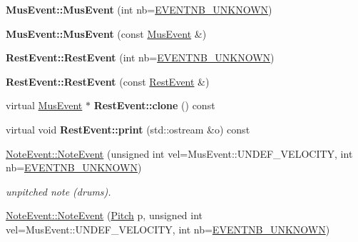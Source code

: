 \begin{DoxyCompactItemize}
\mbox{\label{group__segment_ga00b69e8f1bf80a478fce420d5d378c17}} 
{\bfseries Mus\+Event\+::\+Mus\+Event} (int nb=\mbox{\hyperlink{group__general_gac3b19762b16f33de03662fd4289fe5a9}{E\+V\+E\+N\+T\+N\+B\+\_\+\+U\+N\+K\+N\+O\+WN}})
\item 
\mbox{\label{group__segment_ga40f47305a4bd7afbf26a4fbee663dd27}} 
{\bfseries Mus\+Event\+::\+Mus\+Event} (const \mbox{\hyperlink{classMusEvent}{Mus\+Event}} \&)
\item 
\mbox{\label{group__segment_gaafcefa86601b97d137cfba40ed349414}} 
{\bfseries Rest\+Event\+::\+Rest\+Event} (int nb=\mbox{\hyperlink{group__general_gac3b19762b16f33de03662fd4289fe5a9}{E\+V\+E\+N\+T\+N\+B\+\_\+\+U\+N\+K\+N\+O\+WN}})
\item 
\mbox{\label{group__segment_gac4e65b67dedabe1736d414b8b4ab7e91}} 
{\bfseries Rest\+Event\+::\+Rest\+Event} (const \mbox{\hyperlink{classRestEvent}{Rest\+Event}} \&)
\item 
\mbox{\label{group__segment_ga6ebb6acd4c78929d31a4831c58911639}} 
virtual \mbox{\hyperlink{classMusEvent}{Mus\+Event}} $\ast$ {\bfseries Rest\+Event\+::clone} () const
\item 
\mbox{\label{group__segment_ga0b9fce9fff8648eae4a51a77957fab45}} 
virtual void {\bfseries Rest\+Event\+::print} (std\+::ostream \&o) const
\item 
\mbox{\label{group__segment_gaeeb3a0d391bef4a285f1be45d31e63be}} 
\mbox{\hyperlink{group__segment_gaeeb3a0d391bef4a285f1be45d31e63be}{Note\+Event\+::\+Note\+Event}} (unsigned int vel=Mus\+Event\+::\+U\+N\+D\+E\+F\+\_\+\+V\+E\+L\+O\+C\+I\+TY, int nb=\mbox{\hyperlink{group__general_gac3b19762b16f33de03662fd4289fe5a9}{E\+V\+E\+N\+T\+N\+B\+\_\+\+U\+N\+K\+N\+O\+WN}})
\begin{DoxyCompactList}\small\item\em unpitched note (drums). \end{DoxyCompactList}\item 
\mbox{\label{group__segment_ga1bd25b8699a9ed866f11f62a844645f7}} 
\mbox{\hyperlink{group__segment_ga1bd25b8699a9ed866f11f62a844645f7}{Note\+Event\+::\+Note\+Event}} (\mbox{\hyperlink{classPitch}{Pitch}} p, unsigned int vel=Mus\+Event\+::\+U\+N\+D\+E\+F\+\_\+\+V\+E\+L\+O\+C\+I\+TY, int nb=\mbox{\hyperlink{group__general_gac3b19762b16f33de03662fd4289fe5a9}{E\+V\+E\+N\+T\+N\+B\+\_\+\+U\+N\+K\+N\+O\+WN}})

\end{DoxyCompactItemize}
